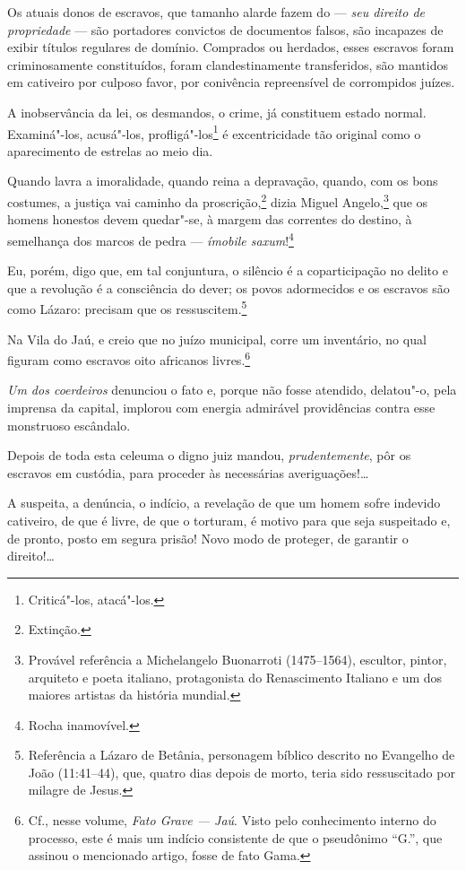 Os atuais donos de escravos, que tamanho alarde fazem do --- \emph{seu
direito de propriedade} --- são portadores convictos de documentos
falsos, são incapazes de exibir títulos regulares de domínio. Comprados
ou herdados, esses escravos foram criminosamente constituídos, foram
clandestinamente transferidos, são mantidos em cativeiro por culposo
favor, por conivência repreensível de corrompidos juízes.

A inobservância da lei, os desmandos, o crime, já constituem estado
normal. Examiná"-los, acusá"-los, profligá"-los\footnote{Criticá"-los,
  atacá"-los.} é excentricidade tão original como o aparecimento de
estrelas ao meio dia.

Quando lavra a imoralidade, quando reina a depravação, quando, com os
bons costumes, a justiça vai caminho da proscrição,\footnote{Extinção.}
dizia Miguel Angelo,\footnote{Provável referência a Michelangelo
  Buonarroti (1475--1564), escultor, pintor, arquiteto e poeta italiano,
  protagonista do Renascimento Italiano e um dos maiores artistas da
  história mundial.} que os homens honestos devem quedar"-se, à margem
das correntes do destino, à semelhança dos marcos de pedra ---
\emph{ímobile saxum}!\footnote{Rocha inamovível.}

Eu, porém, digo que, em tal conjuntura, o silêncio é a coparticipação no
delito e que a revolução é a consciência do dever; os povos adormecidos
e os escravos são como Lázaro: precisam que os ressuscitem.\footnote{
  Referência a Lázaro de Betânia, personagem bíblico descrito no
  Evangelho de João (11:41--44), que, quatro dias depois de morto, teria
  sido ressuscitado por milagre de Jesus.}

Na Vila do Jaú, e creio que no juízo municipal, corre um inventário, no
qual figuram como escravos oito africanos livres.\footnote{Cf., nesse
  volume, \emph{Fato Grave --- Jaú}. Visto pelo conhecimento
  interno do processo, este é mais um indício consistente de que o
  pseudônimo ``G.'', que assinou o mencionado artigo, fosse de fato Gama.}

\emph{Um dos coerdeiros} denunciou o fato e, porque não fosse atendido,
delatou"-o, pela imprensa da capital, implorou com energia admirável
providências contra esse monstruoso escândalo.

Depois de toda esta celeuma o digno juiz mandou, \emph{prudentemente},
pôr os escravos em custódia, para proceder às necessárias
averiguações!\ldots{}

A suspeita, a denúncia, o indício, a revelação de que um homem sofre
indevido cativeiro, de que é livre, de que o torturam, é motivo para que
seja suspeitado e, de pronto, posto em segura prisão! Novo modo de
proteger, de garantir o direito!\ldots{}

